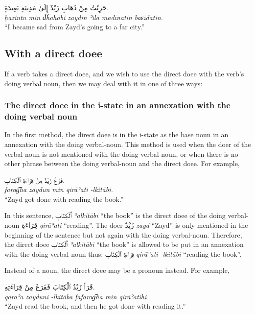 \documentclass[
  10pt,
]{book}
\begin{document}
\foreignlanguage{arabic}{حَزِنْتُ مِنْ ذَهَابِ زَيْدٌ إِلَىٰ مَدِينَةٍ بَعِيدَةٍ.}\\
\emph{ḥazintu min d͡hahābi zaydin ʾilā madīnatin baɛīdatin.}\\
\enquote{I became sad from Zayd's going to a far city.}

\subsection{With a direct doee}\label{with-a-direct-doee}

If a verb takes a direct doee, and we wish to use the direct doee with the verb's doing verbal noun, then we may deal with it in one of three ways:

\subsubsection{The direct doee in the i-state in an annexation with the doing verbal noun}\label{the-direct-doee-in-the-i-state-in-an-annexation-with-the-doing-verbal-noun}

In the first method, the direct doee is in the i-state as the base noun in an annexation with the doing verbal-noun. This method is used when the doer of the verbal noun is not mentioned with the doing verbal-noun, or when there is no other phrase between the doing verbal-noun and the direct doee. For example,

\foreignlanguage{arabic}{فَرَغَ زَيْدٌ مِنْ قِرَاءَةِ ٱلْکِتَابِ.}\\
\emph{farag͡ha zaydun min qirāʾati -lkitābi.}\\
\enquote{Zayd got done with reading the book.}

In this sentence, \foreignlanguage{arabic}{ٱَلْکِتَابِ} \emph{ʾalkitābi} \enquote{the book} is the direct doee of the doing verbal-noun \foreignlanguage{arabic}{قِرَاءَةِ} \emph{qirāʾati} \enquote{reading}. The doer \foreignlanguage{arabic}{زَيْدٌ} \emph{zayd} \enquote{Zayd} is only mentioned in the beginning of the sentence but not again with the doing verbal-noun. Therefore, the direct doee \foreignlanguage{arabic}{ٱَلْکِتَابِ} \emph{ʾalkitābi} \enquote{the book} is allowed to be put in an annexation with the doing verbal noun thus: \foreignlanguage{arabic}{قِرَاءَةِ ٱلْکِتَابِ} \emph{qirāʾati -lkitābi} \enquote{reading the book}.

Instead of a noun, the direct doee may be a pronoun instead. For example,

\foreignlanguage{arabic}{قَرَأ زَيْدٌ ٱلْکِتَابَ فَفَرَغَ مِنْ قِرَاءَتِهِ.}\\
\emph{qaraʾa zayduni -lkitāba fafarag͡ha min qirāʾatihi}\\
\enquote{Zayd read the book, and then he got done with reading it.}
\end{document}
